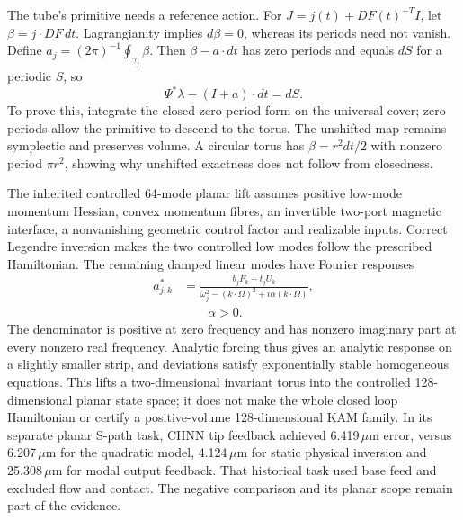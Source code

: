 The tube's primitive needs a reference action. For $J=j(t)+DF(t)^{-T}I$, let $\beta=j\cdot DF\,dt$. Lagrangianity implies $d\beta=0$, whereas its periods need not vanish. Define $a_j=(2\pi)^{-1}\oint_{\gamma_j}\beta$. Then $\beta-a\cdot dt$ has zero periods and equals $dS$ for a periodic $S$, so
\begin{equation}
 \Psi^*\lambda-(I+a)\cdot dt=dS.
 \label{eq:supp-learn-reference-action}
\end{equation}
To prove this, integrate the closed zero-period form on the universal cover; zero periods allow the primitive to descend to the torus. The unshifted map remains symplectic and preserves volume. A circular torus has $\beta=r^2dt/2$ with nonzero period $\pi r^2$, showing why unshifted exactness does not follow from closedness.

The inherited controlled 64-mode planar lift assumes positive low-mode momentum Hessian, convex momentum fibres, an invertible two-port magnetic interface, a nonvanishing geometric control factor and realizable inputs. Correct Legendre inversion makes the two controlled low modes follow the prescribed Hamiltonian. The remaining damped linear modes have Fourier responses
\begin{equation}
 \begin{aligned}
 a^*_{j,k}&=\frac{b_jF_k+t_jU_k}{\omega_j^2-(k\cdot\Omega)^2+i\alpha(k\cdot\Omega)},\\
 &\qquad\alpha>0.
 \end{aligned}
 \label{eq:supp-learn-planar-lift}
\end{equation}
The denominator is positive at zero frequency and has nonzero imaginary part at every nonzero real frequency. Analytic forcing thus gives an analytic response on a slightly smaller strip, and deviations satisfy exponentially stable homogeneous equations. This lifts a two-dimensional invariant torus into the controlled 128-dimensional planar state space; it does not make the whole closed loop Hamiltonian or certify a positive-volume 128-dimensional KAM family. In its separate planar S-path task, CHNN tip feedback achieved 6.419\,$\mu$m error, versus 6.207\,$\mu$m for the quadratic model, 4.124\,$\mu$m for static physical inversion and 25.308\,$\mu$m for modal output feedback. That historical task used base feed and excluded flow and contact. The negative comparison and its planar scope remain part of the evidence.

